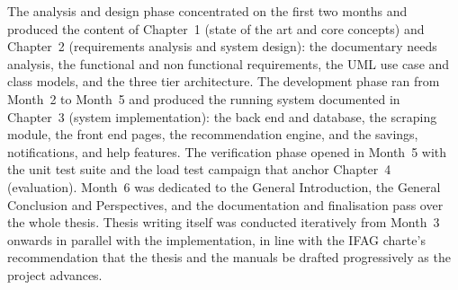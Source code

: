 The analysis and design phase concentrated on the first two months and produced the content of Chapter~1 (state of the art and core concepts) and Chapter~2 (requirements analysis and system design): the documentary needs analysis, the functional and non functional requirements, the UML use case and class models, and the three tier architecture. The development phase ran from Month~2 to Month~5 and produced the running system documented in Chapter~3 (system implementation): the back end and database, the scraping module, the front end pages, the recommendation engine, and the savings, notifications, and help features. The verification phase opened in Month~5 with the unit test suite and the load test campaign that anchor Chapter~4 (evaluation). Month~6 was dedicated to the General Introduction, the General Conclusion and Perspectives, and the documentation and finalisation pass over the whole thesis. Thesis writing itself was conducted iteratively from Month~3 onwards in parallel with the implementation, in line with the IFAG charte's recommendation that the thesis and the manuals be drafted progressively as the project advances.
